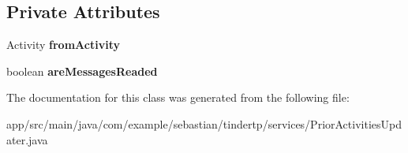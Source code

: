 \subsection*{Private Attributes}
\begin{DoxyCompactItemize}
\item 
Activity {\bfseries from\+Activity}\hypertarget{classcom_1_1example_1_1sebastian_1_1tindertp_1_1services_1_1PriorActivitiesUpdater_a9d573507f6d7212bdc57d4c6440e8f05}{}\label{classcom_1_1example_1_1sebastian_1_1tindertp_1_1services_1_1PriorActivitiesUpdater_a9d573507f6d7212bdc57d4c6440e8f05}

\item 
boolean {\bfseries are\+Messages\+Readed}\hypertarget{classcom_1_1example_1_1sebastian_1_1tindertp_1_1services_1_1PriorActivitiesUpdater_a4004ed7fb825ba37ab1f6e0fc19d374f}{}\label{classcom_1_1example_1_1sebastian_1_1tindertp_1_1services_1_1PriorActivitiesUpdater_a4004ed7fb825ba37ab1f6e0fc19d374f}

\end{DoxyCompactItemize}


The documentation for this class was generated from the following file\+:\begin{DoxyCompactItemize}
\item 
app/src/main/java/com/example/sebastian/tindertp/services/Prior\+Activities\+Updater.\+java\end{DoxyCompactItemize}
